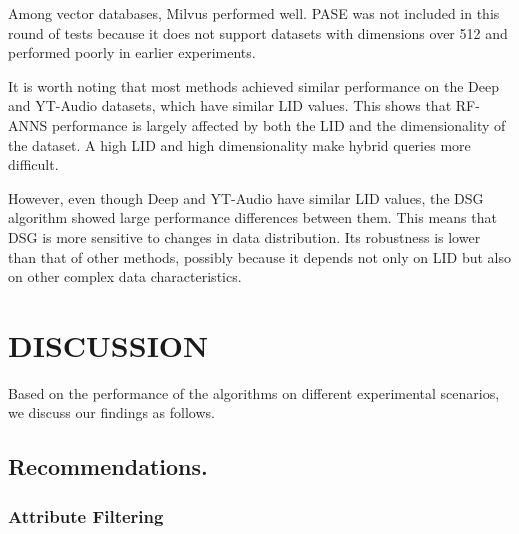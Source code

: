 \documentclass[sigconf, nonacm]{acmart}
\begin{document}
Among vector databases, Milvus performed well. PASE was not included in this round of tests because it does not support datasets with dimensions over 512 and performed poorly in earlier experiments.

It is worth noting that most methods achieved similar performance on the Deep and YT-Audio datasets, which have similar LID values. This shows that RF-ANNS performance is largely affected by both the LID and the dimensionality of the dataset. A high LID and high dimensionality make hybrid queries more difficult.

However, even though Deep and YT-Audio have similar LID values, the DSG algorithm showed large performance differences between them. This means that DSG is more sensitive to changes in data distribution. Its robustness is lower than that of other methods, possibly because it depends not only on LID but also on other complex data characteristics.
%	
	
	\section{DISCUSSION}
	Based on the performance of the algorithms on different experimental scenarios, we discuss our findings as follows.
	
	
	\subsection{Recommendations.}
	\subsubsection{\textbf{Attribute Filtering}}
	
\end{document}
